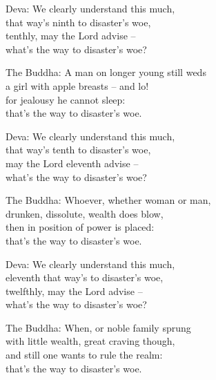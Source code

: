 \begin{MyDescription}{Deva:}
We clearly understand this much,\\
that way's ninth to disaster's woe,\\
tenthly, may the Lord advise – \\
what's the way to disaster's woe?
\end{MyDescription}      

\begin{MyDescription}{The Buddha:}
A  man on longer young still weds\\
a girl with apple breasts – and lo!\\
for jealousy he cannot sleep:\\
that's the way to disaster's woe.
\end{MyDescription}     

\begin{MyDescription}{Deva:}
We clearly understand this much,\\
that way's tenth to disaster's woe,\\
may the Lord eleventh advise – \\
what's the way to disaster's woe?
\end{MyDescription}     
   
\begin{MyDescription}{The Buddha:}
Whoever, whether woman or man,\\
drunken, dissolute, wealth does blow,\\
then in position of power is placed:\\
that's the way to disaster's woe.
\end{MyDescription}
      
\begin{MyDescription}{Deva:}
We clearly understand this much,\\
eleventh that way's to disaster's woe,\\
twelfthly, may the Lord advise – \\
what's the way to disaster's woe?
\end{MyDescription}
   	   
\begin{MyDescription}{The Buddha:}
When, or noble family sprung\\
with little wealth, great craving though,\\
and still one wants to rule the realm:\\
that's the way to disaster's woe.
\end{MyDescription}
   
